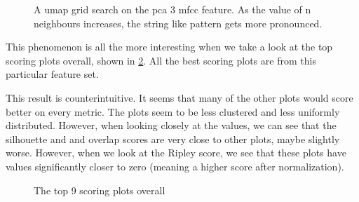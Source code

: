 \documentclass[11pt]{article}
\begin{document}
\begin{figure}[h!tbp]
\centering
{}
\caption{A umap grid search on the pca 3 mfcc feature. As the value of n neighbours increases, the string like pattern gets more pronounced.}
\label{fig:umap_3d_pca_grid_search}
\end{figure}

This phenomenon is all the more interesting when we take a look at the top scoring plots overall, shown in \ref{fig:top_overall}. All the best scoring plots are from this particular feature set.

This result is counterintuitive. It seems that many of the other plots would score better on every metric. The plots seem to be less clustered and less uniformly distributed. However, when looking closely at the values, we can see that the silhouette and and overlap scores are very close to other plots, maybe slightly worse. However, when we look at the Ripley score, we see that these plots have values significantly closer to zero (meaning a higher score after normalization).

\begin{figure}[htbp]
\centering
{}
\caption{The top 9 scoring plots overall}
\label{fig:top_overall}
\end{figure}
\end{document}
